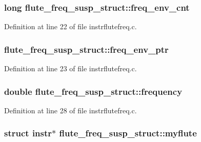 \subsubsection[{\texorpdfstring{freq\+\_\+env\+\_\+cnt}{freq_env_cnt}}]{\setlength{\rightskip}{0pt plus 5cm}long flute\+\_\+freq\+\_\+susp\+\_\+struct\+::freq\+\_\+env\+\_\+cnt}\hypertarget{structflute__freq__susp__struct_a5793a4e58435810d358f95e608d2232f}{}\label{structflute__freq__susp__struct_a5793a4e58435810d358f95e608d2232f}


Definition at line 22 of file instrflutefreq.\+c.

\subsubsection[{\texorpdfstring{freq\+\_\+env\+\_\+ptr}{freq_env_ptr}}]{ flute\+\_\+freq\+\_\+susp\+\_\+struct\+::freq\+\_\+env\+\_\+ptr}\hypertarget{structflute__freq__susp__struct_ade933e428bd6770c80b6d785c0e8321a}{}\label{structflute__freq__susp__struct_ade933e428bd6770c80b6d785c0e8321a}


Definition at line 23 of file instrflutefreq.\+c.

\subsubsection[{\texorpdfstring{frequency}{frequency}}]{\setlength{\rightskip}{0pt plus 5cm}double flute\+\_\+freq\+\_\+susp\+\_\+struct\+::frequency}\hypertarget{structflute__freq__susp__struct_a067087bd61f727708f92dc5980492b2e}{}\label{structflute__freq__susp__struct_a067087bd61f727708f92dc5980492b2e}


Definition at line 28 of file instrflutefreq.\+c.

\subsubsection[{\texorpdfstring{myflute}{myflute}}]{\setlength{\rightskip}{0pt plus 5cm}struct {\bf instr}$\ast$ flute\+\_\+freq\+\_\+susp\+\_\+struct\+::myflute}\hypertarget{structflute__freq__susp__struct_a70395e322dc44af765d17f8b710dc1bb}{}\label{structflute__freq__susp__struct_a70395e322dc44af765d17f8b710dc1bb}


